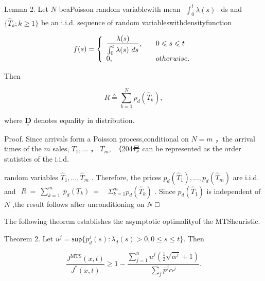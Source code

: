 Lemma 2. Let \(N\) beaPoisson random variablewith mean
\(\begin{array} { r } { \int _ { 0 } ^ { t } \lambda ( s ) } \end{array}\)
ds and \(\{ \hat { T } _ { k } ; k \ge 1 \}\) be an i.i.d. sequence of
random variableswithdensityfunction

\[
f ( s ) = \left\{ \begin{array} { l l } { \displaystyle \frac { \lambda ( s ) } { \int _ { 0 } ^ { t } \lambda ( s ) ~ d s } , \quad } & { 0 \leqslant s \leqslant t } \\ { 0 , \quad } & { o t h e r w i s e . } \end{array} \right.
\]

Then

\[
R \overset { \vartriangle } { = } \sum _ { k = 1 } ^ { N } p _ { d } ( \hat { T } _ { k } ) ,
\]

where \(\underline { { \underline { { \mathbf { D } } } } }\) denotes
equality in distribution.

Proof. Since arrivals form a Poisson process,conditional on \(N = m\)
，the arrival times of the \(m\) sales, \(T _ { 1 } , \dots\) ，
\(T _ { m } ,\) （204号 can be represented as the order statistics of
the i.i.d.

random variables \(\hat { T } _ { 1 } , \dots , \hat { T } _ { m }\) .
Therefore, the prices
\(p _ { d } ( \hat { T } _ { 1 } ) , . . . , p _ { d } ( \hat { T } _ { m } )\)
are i.i.d. and
\(\begin{array} { r } { R \ = \ \sum _ { k = 1 } ^ { m } \ p _ { d } ( T _ { k } ) \ = \ } \end{array}\)
\(\Sigma _ { k = 1 } ^ { m } p _ { d } ( \hat { T } _ { k } )\) . Since
\(p _ { d } ( \hat { T } _ { 1 } )\) is independent of \(N\) ,the result
follows after unconditioning on \(N\) □

The following theorem establishes the asymptotic optimalityof the
MTSheuristic.

Theorem 2. Let
\(u ^ { j } = \mathsf { s u p } \{ p _ { d } ^ { j } ( s ) \colon \lambda _ { d } ( s ) > 0 , 0 \leqslant s \leqslant t \} .\)
Then

\[
\frac { J ^ { \mathrm { M T S } } ( x , t ) } { J ^ { * } ( x , t ) } \geqslant 1 - \frac { \sum _ { j = 1 } ^ { n } u ^ { j } ( \frac { 1 } { 2 } \sqrt { \alpha ^ { j } } + 1 ) } { \sum _ { j } \bar { p } ^ { j } \alpha ^ { j } } .
\]

